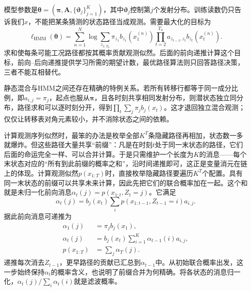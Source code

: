 模型参数是$\bm\theta=(\bm\pi,\bm A,\{\bm\vartheta_j\}_{j=1}^K)$，其中$\bm\vartheta_j$控制第$j$个发射分布。训练读数仍只告诉我们$x$，不能把某条猜测的状态路径当成观测。需要最大化的目标为
\begin{equation}
  \ell_{\mathrm{HMM}}(\bm\theta)
   =\sum_{n=1}^{N}\log\sum_{z_{1:T_n}}
       \pi_{z_1}b_{z_1}(x^{(n)}_1)
       \prod_{t=2}^{T_n}a_{z_{t-1},z_t}b_{z_t}(x^{(n)}_t).
  \label{eq:pgm-dynamic-hmm-objective}
\end{equation}
求和使每条可能工况路径都按其概率贡献观测似然。后面的前向递推计算这个目标，前向--后向递推提供学习所需的期望计数，最优路径算法则只回答路径决策，三者不能互相替代。

静态混合与HMM之间还存在精确的特例关系。若所有转移行都等于同一成分比例，即$a_{i,j}=\pi_j$，起点也服从$\bm\pi$，且各时刻共享相同发射分布，则潜状态独立同分布，路径求和可以逐时刻分开，得到$\prod_t\sum_j\pi_jb_j(x_t)$。这才退回独立混合观测；仅仅让转移表对角元素较小，并不消除状态之间的依赖。

计算观测序列似然时，最笨的办法是枚举全部$K^T$条隐藏路径再相加，状态数一多就爆炸。但这些路径大量共享“前缀”：凡是在时刻$t$处于同一末状态的路径，它们后面的命运完全一样、可以合并计算。于是只需维护一个长度为$K$的消息——每个末状态对应的“所有到此前缀的概率之和”，沿时间递推即可，这正是变量消元在链上的体现。计算观测似然$p(x_{1:T})$时，直接枚举隐藏路径要遍历$K^T$个配置。具有同一末状态的前缀可以共享未来计算，因此先把它们的联合概率加在一起。这个和就是未归一化前向消息$\alpha_t(j)=p(x_{1:t},Z_t=j)$。它满足
\[
  \alpha_t(j)
    =b_j(x_t)\sum_i
      p(x_{1:t-1},Z_{t-1}=i)a_{i,j}.
\]
据此前向消息可递推为
\begin{equation}
  \begin{aligned}
    \alpha_1(j)&=\pi_jb_j(x_1),\\
    \alpha_t(j)&=b_j(x_t)\sum_{i=1}^{K}
      \alpha_{t-1}(i)a_{i,j},\\
    p(x_{1:T})&=\sum_j\alpha_T(j).
  \end{aligned}
  \label{eq:pgm-dynamic-forward}
\end{equation}
递推每次消去$Z_{t-1}$，更早路径的贡献已汇总到$\alpha_{t-1}$中。从初始联合概率出发，这一步始终保持$\alpha_t$的概率含义，也说明了前缀合并为何精确。将各状态的消息归一化，$\alpha_t(j)/\sum_i\alpha_t(i)$就是滤波概率。

